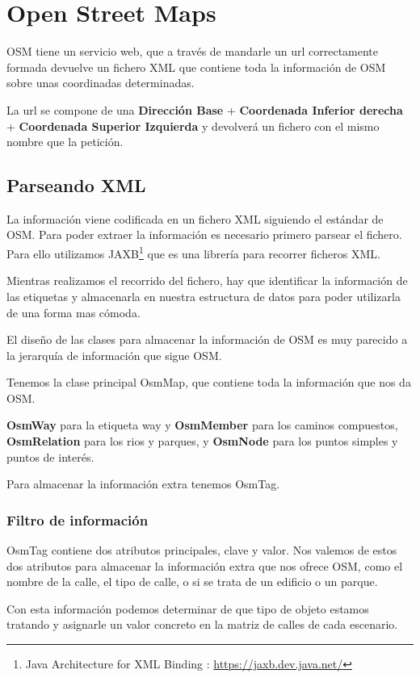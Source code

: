 \section*{Open Street Maps}
OSM tiene un servicio web, que a través de mandarle un url correctamente
formada devuelve un fichero XML que contiene toda la información de OSM sobre
unas coordinadas determinadas.

La url se compone de una {\bf Dirección Base} + {\bf Coordenada Inferior
 derecha} + {\bf Coordenada Superior Izquierda} y devolverá un fichero con el
mismo nombre que la petición.
\subsection*{Parseando XML}
La información viene codificada en un fichero XML siguiendo el estándar de OSM.
Para poder extraer la información es necesario primero parsear el fichero.
Para ello utilizamos JAXB\footnote{Java Architecture for XML Binding :
\url{https://jaxb.dev.java.net/}} que es una librería para recorrer ficheros
XML. 

Mientras realizamos el recorrido del fichero, hay que identificar la
información de las etiquetas y almacenarla en nuestra estructura de datos para
poder utilizarla de una forma mas cómoda.

El diseño de las clases para almacenar la información de OSM es muy parecido a
la jerarquía de información que sigue OSM.

Tenemos la clase principal OsmMap, que contiene toda la información que nos da
OSM.

{\bf OsmWay} para la etiqueta way y {\bf OsmMember} para los caminos
compuestos, {\bf OsmRelation} para los rios y parques, y {\bf OsmNode} para los
puntos simples y puntos de interés. 

Para almacenar la información extra tenemos OsmTag.
\subsubsection*{Filtro de información}
OsmTag contiene dos atributos principales, clave y valor. Nos valemos de estos
dos atributos para almacenar la información extra que nos ofrece OSM, como el
nombre de la calle, el tipo de calle, o si se trata de un edificio o un parque.

Con esta información podemos determinar de que tipo de objeto estamos tratando
y asignarle un valor concreto en la matriz de calles de cada escenario.

